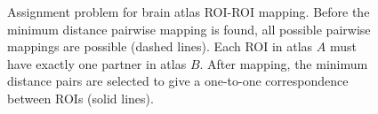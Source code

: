\documentclass[10pt,letterpaper]{article}\usepackage[]{graphicx}\usepackage[]{color}
\begin{document}
\begin{figure}[h!]
	\centering
	\caption{Assignment problem for brain atlas ROI-ROI mapping. Before the minimum distance pairwise mapping is found, all possible pairwise mappings are possible (dashed lines). Each ROI in atlas $A$ must have exactly one partner in atlas $B$. After mapping, the minimum distance pairs are selected to give a one-to-one correspondence between ROIs (solid lines).}\label{fig:assignment_atlases}
\end{figure}
\end{document}

